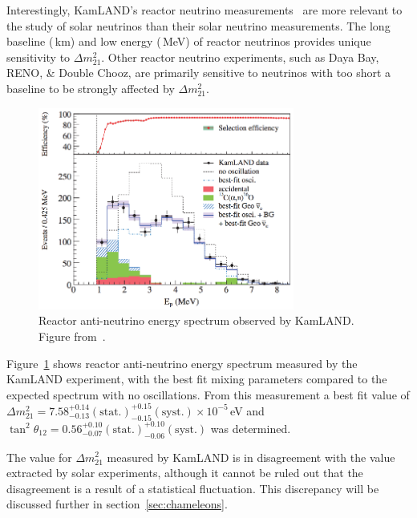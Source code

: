 Interestingly, KamLAND's reactor neutrino measurements~\cite{kamland_reactor} are
more relevant to the study of solar neutrinos than their solar neutrino measurements.
The long baseline (\,km) and low energy (\,MeV) of reactor neutrinos provides
unique sensitivity to $\Delta m^{2}_{21}$.
Other reactor neutrino experiments, such as Daya Bay, RENO, \& Double Chooz,
are primarily sensitive to neutrinos with too short a baseline to be strongly
affected by $\Delta m^{2}_{21}$.

\begin{figure}[htbp]
  \centering
  \includegraphics[width=0.75\textwidth]{kamland_reactor_spectrum}
  \caption[Kamland Reactor Spectrum]{Reactor anti-neutrino energy spectrum observed by KamLAND.
                                    Figure from~\cite{kamland_reactor}.}
  \label{fig:kamland_reactor}
\end{figure}

Figure~\ref{fig:kamland_reactor} shows reactor anti-neutrino energy spectrum measured
by the KamLAND experiment, with the best fit mixing parameters compared to the
expected spectrum with no oscillations.
From this measurement a best fit value of $\Delta m^{2}_{21} = 7.58^{+0.14}_{-0.13}(\mathrm{stat.})^{+0.15}_{-0.15}(\mathrm{syst.}) \times 10^{-5}$\,eV
and $\tan^{2} \theta_{12} = 0.56^{+0.10}_{-0.07}(\mathrm{stat.})^{+0.10}_{-0.06}(\mathrm{syst.})$ was determined.

The value for $\Delta m^{2}_{21}$ measured by KamLAND is in disagreement with the value extracted
by solar experiments, although it cannot be ruled out that the disagreement
is a result of a statistical fluctuation. This discrepancy will be discussed further
in section~\ref{sec:chameleons}.
